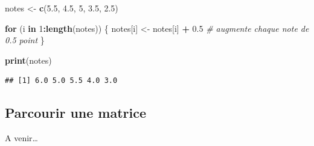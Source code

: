 \documentclass[
]{book}
\newenvironment{Shaded}{\begin{snugshade}}{\end{snugshade}}
\newcommand{\CommentTok}[1]{\textcolor[rgb]{0.56,0.35,0.01}{\textit{#1}}}
\newcommand{\ControlFlowTok}[1]{\textcolor[rgb]{0.13,0.29,0.53}{\textbf{#1}}}
\newcommand{\DecValTok}[1]{\textcolor[rgb]{0.00,0.00,0.81}{#1}}
\newcommand{\FloatTok}[1]{\textcolor[rgb]{0.00,0.00,0.81}{#1}}
\newcommand{\FunctionTok}[1]{\textcolor[rgb]{0.13,0.29,0.53}{\textbf{#1}}}
\newcommand{\NormalTok}[1]{#1}
\newcommand{\OtherTok}[1]{\textcolor[rgb]{0.56,0.35,0.01}{#1}}
\newcommand{\SpecialCharTok}[1]{\textcolor[rgb]{0.81,0.36,0.00}{\textbf{#1}}}
\begin{document}
\begin{Shaded}
\begin{Highlighting}[]
\NormalTok{notes }\OtherTok{\textless{}{-}} \FunctionTok{c}\NormalTok{(}\FloatTok{5.5}\NormalTok{, }\FloatTok{4.5}\NormalTok{, }\DecValTok{5}\NormalTok{, }\FloatTok{3.5}\NormalTok{, }\FloatTok{2.5}\NormalTok{)}

\ControlFlowTok{for}\NormalTok{ (i }\ControlFlowTok{in} \DecValTok{1}\SpecialCharTok{:}\FunctionTok{length}\NormalTok{(notes)) \{}
\NormalTok{  notes[i] }\OtherTok{\textless{}{-}}\NormalTok{ notes[i] }\SpecialCharTok{+} \FloatTok{0.5}  \CommentTok{\# augmente chaque note de 0.5 point}
\NormalTok{\}}

\FunctionTok{print}\NormalTok{(notes)}
\end{Highlighting}
\end{Shaded}

\begin{verbatim}
## [1] 6.0 5.0 5.5 4.0 3.0
\end{verbatim}

\subsection{Parcourir une matrice}\label{parcourir-une-matrice}

A venir\ldots{}

  
\end{document}
